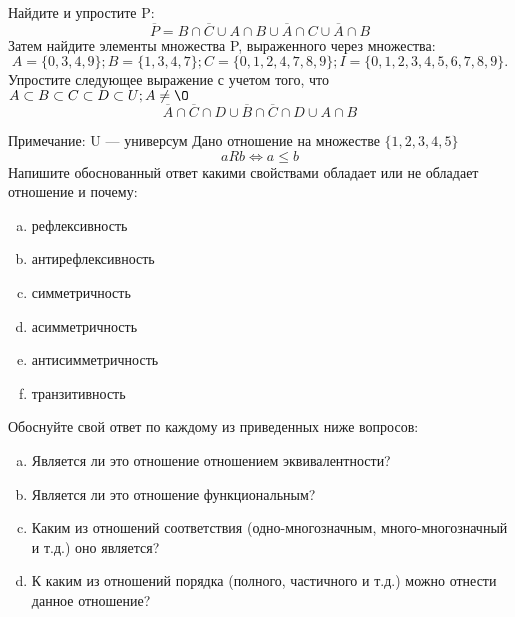\documentclass[10pt]{exam}
\begin{document}
\begin{questions}
\question
Найдите и упростите P:
\begin{equation*}
\overline{P} = B \cap \overline{C} \cup A \cap B \cup \overline{A} \cap C \cup \overline{A} \cap B
\end{equation*}
Затем найдите элементы множества P, выраженного через множества:
\begin{equation*}
A = \{0, 3, 4, 9\}; 
B = \{1, 3, 4, 7\};
C = \{0, 1, 2, 4, 7, 8, 9\};
I = \{0, 1, 2, 3, 4, 5, 6, 7, 8, 9\}.
\end{equation*}\question
Упростите следующее выражение с учетом того, что $A\subset B \subset C \subset D \subset U; A \neq \O$
\begin{equation*}
\overline{A} \cap \overline{C} \cap D \cup \overline{B} \cap \overline{C} \cap D \cup A \cap B
\end{equation*}

Примечание: U — универсум\question
Дано отношение на множестве $\{1, 2, 3, 4, 5\}$ 
\begin{equation*}
aRb \iff a \leq b
\end{equation*}
Напишите обоснованный ответ какими свойствами обладает или не обладает отношение и почему:   
\begin{enumerate} [a)]\setcounter{enumi}{0}
\item рефлексивность
\item антирефлексивность
\item симметричность
\item асимметричность
\item антисимметричность
\item транзитивность
\end{enumerate}

Обоснуйте свой ответ по каждому из приведенных ниже вопросов:
\begin{enumerate} [a)]\setcounter{enumi}{0}
    \item Является ли это отношение отношением эквивалентности?
    \item Является ли это отношение функциональным?
    \item Каким из отношений соответствия (одно-многозначным, много-многозначный и т.д.) оно является?
    \item К каким из отношений порядка (полного, частичного и т.д.) можно отнести данное отношение?
\end{enumerate}



\end{questions}
\end{document}
